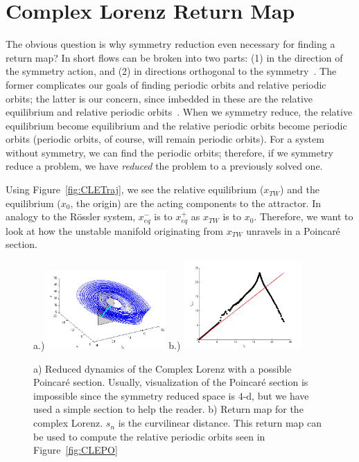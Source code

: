 \documentclass[10pt,letter]{article}
\begin{document}
\section{Complex Lorenz Return Map}
\label{sec:CLE}
The obvious question is why symmetry reduction even necessary for finding
a return map?  In short flows can be broken into two parts: (1) in the
direction of the symmetry action, and (2) in directions orthogonal to the
symmetry~\cite{CB, Eth, Atl}.  The former complicates our goals of
finding periodic orbits and relative periodic orbits; the latter is our
concern, since imbedded in these are the relative equilibrium and
relative periodic orbits~\cite{Atl}.  When we symmetry reduce, the
relative equilibrium become equilibrium and the relative periodic orbits
become periodic orbits (periodic orbits, of course, will remain periodic
orbits).  For a system without symmetry, we can find the periodic orbits;
therefore, if we symmetry reduce a problem, we have \emph{reduced} the
problem to a previously solved one.

Using Figure~\ref{fig:CLETraj}, we see the relative equilibrium
($x_{TW}$) and the equilibrium ($x_0$, the origin) are the acting
components to the attractor.  In analogy to the R\"ossler system,
$x_{eq}^{-}$ is to $x_{eq}^{+}$ as $x_{TW}$ is to $x_0$.  Therefore, we
want to look at how the unstable manifold originating from $x_{TW}$
unravels in a Poincar\'e section.
\begin{figure}[h]
\centering
a.)  \includegraphics[width=0.40\textwidth]{Figs/Section3/kcCLEredaxisonPSc.png}
b.)
  \includegraphics[width=0.40\textwidth]{Figs/Section3/kcCLEretmap.png}
\caption{ a) Reduced dynamics of the Complex Lorenz with a possible
Poincar\'e section.  Usually, visualization of the Poincar\'e section is
impossible since the symmetry reduced space is $4$-d, but we have used a
simple section to help the reader. b) Return map for the complex Lorenz.
$s_n$ is the curvilinear distance.  This return map can be used to
compute the relative periodic orbits seen in Figure~\ref{fig:CLEPO}
}
 \label{fig:CLEretmap}
\end{figure}
\end{document}
